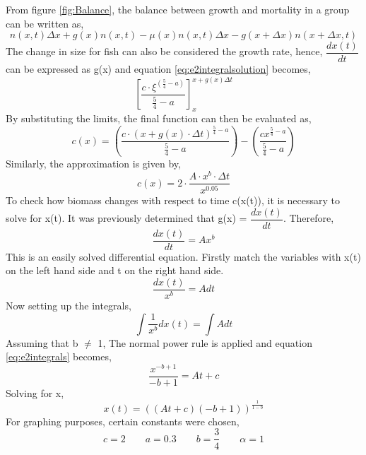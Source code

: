 \documentclass{article}
\numberwithin{equation}{section} %
\begin{document}
From figure \ref{fig:Balance}, the balance between growth and mortality in a group can be written as,
\begin{equation}
    n(x,t)\Delta x + g(x)n(x,t)-\mu (x)n(x,t)\Delta x -g(x+\Delta x)n(x+\Delta x,t)
\end{equation}
The change in size for fish can also be considered the growth rate, hence, $\dfrac{dx(t)}{dt}$ can be expressed as g(x) and equation \ref{eq:e2integralsolution} becomes,
\begin{equation}
    \left[\dfrac{c\cdot\xi^{(\tfrac{5}{4}-a)}}{\tfrac{5}{4}-a}\right]_x^{x+g(x)\Delta t}
\end{equation}
By substituting the limits, the final function can then be evaluated as,
\begin{equation}\label{eq:e2biomass}
    	c(x)=\left(
	    \dfrac{c\cdot\left(
	        x+g(x)\cdot\Delta t
	    \right)^{\tfrac{5}{4}-a}}{\tfrac{5}{4}-a}
	\right)-\left(
	    \dfrac{cx^{\tfrac{5}{4}-a}}{\tfrac{5}{4}-a}
	\right)
\end{equation}
Similarly, the approximation is given by,
\begin{equation}\label{eq:e2approximation}
c(x)=2\cdot\dfrac{A\cdot x^{b}\cdot \Delta t}{x^{0.05}}
\end{equation}
To check how biomass changes with respect to time c(x(t)), it is necessary to solve for x(t). It was previously determined that g(x) = $\dfrac{dx(t)}{dt}$. Therefore, 
\begin{equation}
    \dfrac{dx(t)}{dt}=Ax^{b}
\end{equation}
This is an easily solved differential equation. Firstly  match the variables with x(t) on the left hand side and t on the right hand side. 
\begin{equation}\label{eq:e2diff}
    \dfrac{dx(t)}{x^{b}}=Adt
\end{equation}
Now setting up the integrals,
\begin{equation}\label{eq:e2integrals}
    \int\frac{1}{x^{b}}dx(t)=\int Adt
\end{equation}
Assuming that b $\neq$ 1, The normal power rule is applied and equation \ref{eq:e2integrals} becomes,
\begin{equation}
    \frac{x^{-b+1}}{-b+1}=At+c
\end{equation}
Solving for x,
\begin{equation}\label{eq:e2x(t)}
    x(t)=((At+c)(-b+1))^{\frac{1}{1-b}}
\end{equation}
For graphing purposes, certain constants were chosen,
\begin{equation}\label{eq:e2constants}
c=2 \qquad a=0.3 \qquad  b=\dfrac{3}{4} \qquad \alpha=1
\end{equation}
\end{document}
